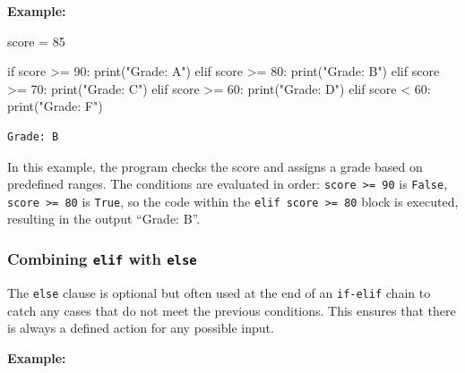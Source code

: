 \documentclass[
  letterpaper,
  DIV=11,
  numbers=noendperiod]{scrreprt}
\newenvironment{Shaded}{\begin{snugshade}}{\end{snugshade}}
\newcommand{\BuiltInTok}[1]{\textcolor[rgb]{0.00,0.23,0.31}{#1}}
\newcommand{\ControlFlowTok}[1]{\textcolor[rgb]{0.00,0.23,0.31}{#1}}
\newcommand{\DecValTok}[1]{\textcolor[rgb]{0.68,0.00,0.00}{#1}}
\newcommand{\NormalTok}[1]{\textcolor[rgb]{0.00,0.23,0.31}{#1}}
\newcommand{\OperatorTok}[1]{\textcolor[rgb]{0.37,0.37,0.37}{#1}}
\newcommand{\StringTok}[1]{\textcolor[rgb]{0.13,0.47,0.30}{#1}}
\begin{document}
\textbf{Example:}

\begin{Shaded}
\begin{Highlighting}[]
\NormalTok{score }\OperatorTok{=} \DecValTok{85}

\ControlFlowTok{if}\NormalTok{ score }\OperatorTok{\textgreater{}=} \DecValTok{90}\NormalTok{:}
    \BuiltInTok{print}\NormalTok{(}\StringTok{"Grade: A"}\NormalTok{)}
\ControlFlowTok{elif}\NormalTok{ score }\OperatorTok{\textgreater{}=} \DecValTok{80}\NormalTok{:}
    \BuiltInTok{print}\NormalTok{(}\StringTok{"Grade: B"}\NormalTok{)}
\ControlFlowTok{elif}\NormalTok{ score }\OperatorTok{\textgreater{}=} \DecValTok{70}\NormalTok{:}
    \BuiltInTok{print}\NormalTok{(}\StringTok{"Grade: C"}\NormalTok{)}
\ControlFlowTok{elif}\NormalTok{ score }\OperatorTok{\textgreater{}=} \DecValTok{60}\NormalTok{:}
    \BuiltInTok{print}\NormalTok{(}\StringTok{"Grade: D"}\NormalTok{)}
\ControlFlowTok{elif}\NormalTok{ score }\OperatorTok{\textless{}} \DecValTok{60}\NormalTok{:}
    \BuiltInTok{print}\NormalTok{(}\StringTok{"Grade: F"}\NormalTok{)}
\end{Highlighting}
\end{Shaded}

\begin{verbatim}
Grade: B
\end{verbatim}

In this example, the program checks the score and assigns a grade based
on predefined ranges. The conditions are evaluated in order:
\texttt{score\ \textgreater{}=\ 90} is \texttt{False},
\texttt{score\ \textgreater{}=\ 80} is \texttt{True}, so the code within
the \texttt{elif\ score\ \textgreater{}=\ 80} block is executed,
resulting in the output ``Grade: B''.

\hypertarget{combining-elif-with-else}{%
\subsubsection{\texorpdfstring{Combining \texttt{elif} with
\texttt{else}}{Combining elif with else}}\label{combining-elif-with-else}}

The \texttt{else} clause is optional but often used at the end of an
\texttt{if-elif} chain to catch any cases that do not meet the previous
conditions. This ensures that there is always a defined action for any
possible input.

\textbf{Example:}
\end{document}
